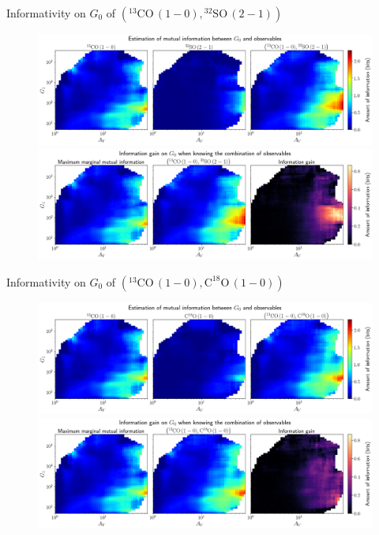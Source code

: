 \documentclass{beamer}
\begin{document}
\begin{frame}{Informativity on $G_0$ of $\left(\mathrm{^{13}CO\,(1-0)},\mathrm{^{32}SO\,(2-1)}\right)$}
    \begin{figure}
        \centering
        \includegraphics[width=0.95\linewidth]{../mi/g0__13co10_32so21_mi.png}
        \vfill
        \includegraphics[width=0.95\linewidth]{../mi/g0__13co10_32so21_mi_gain.png}
    \end{figure}
\end{frame}

\begin{frame}{Informativity on $G_0$ of $\left(\mathrm{^{13}CO\,(1-0)},\mathrm{C^{18}O\,(1-0)}\right)$}
    \begin{figure}
        \centering
        \includegraphics[width=0.95\linewidth]{../mi/g0__13co10_c18o10_mi.png}
        \vfill
        \includegraphics[width=0.95\linewidth]{../mi/g0__13co10_c18o10_mi_gain.png}
    \end{figure}
\end{frame}
\end{document}
